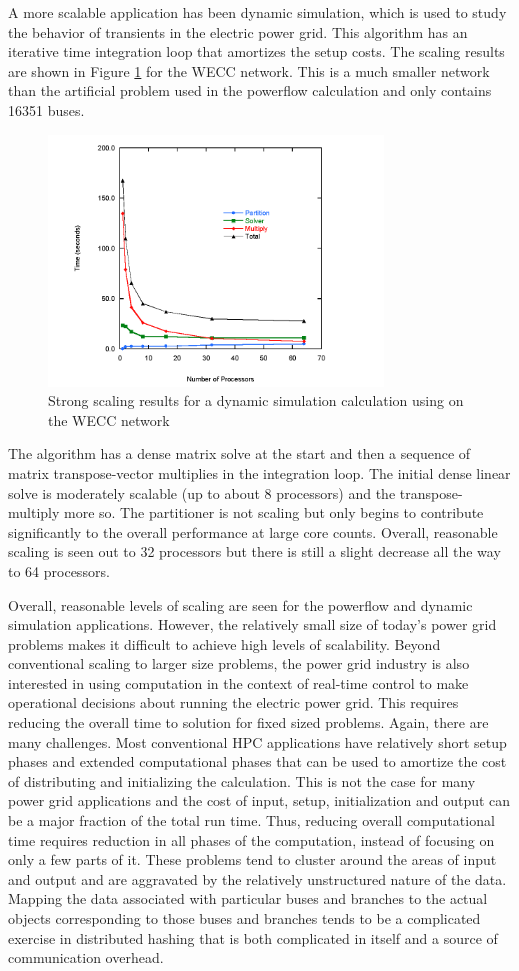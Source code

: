 \documentclass[preprint]{acm_proc_article-sp}
\begin{document}
A more scalable application has been dynamic simulation, which is used to study
the behavior of transients in the electric power grid\cite{DS}. This algorithm has an
iterative time integration loop that amortizes the setup costs. The scaling
results are shown in Figure \ref{ds} for the WECC network. This is a much
smaller network than the artificial problem used in the powerflow calculation
and only contains 16351 buses.
\begin{figure}
\centering
\includegraphics[width=3.5in,keepaspectratio=true]{./Fig9}
\caption{\label{ds} Strong scaling results for a dynamic simulation calculation
using on the WECC network}
\end{figure}
The algorithm has a dense matrix solve at the start and then a sequence of matrix
transpose-vector multiplies in the integration loop. The initial dense linear
solve is moderately scalable (up to about 8 processors)
and the transpose-multiply more so. The partitioner
is not scaling but only begins to contribute significantly to the overall
performance at large core counts. Overall, reasonable scaling is seen out to 32
processors but there is still a slight decrease all the way to 64 processors.

Overall, reasonable levels of scaling are seen for the powerflow and
dynamic simulation applications. However, the relatively
small size of today's power grid problems makes it difficult to achieve high
levels of scalability.  Beyond conventional scaling to larger size problems,
the power grid industry is also interested in using
computation in the context of real-time control to make operational decisions
about running the electric power grid. This requires reducing
the overall time to solution for fixed sized problems. Again, there are many
challenges. Most conventional HPC applications have relatively short setup
phases and extended computational phases that can be used to amortize the cost
of distributing and initializing the calculation. This is not the case for many
power grid applications and the cost of input, setup, initialization and output
can be a major fraction of the total run time. Thus, reducing overall
computational time requires reduction in all phases of the computation, instead
of focusing on only a few parts of it. These problems tend to cluster around the
areas of input and output and are aggravated by the relatively unstructured
nature of the data. Mapping the data associated with particular buses and
branches to the actual objects corresponding to those buses and branches tends
to be a complicated exercise in distributed hashing that is both complicated in
itself and a source of communication overhead.
\end{document}
